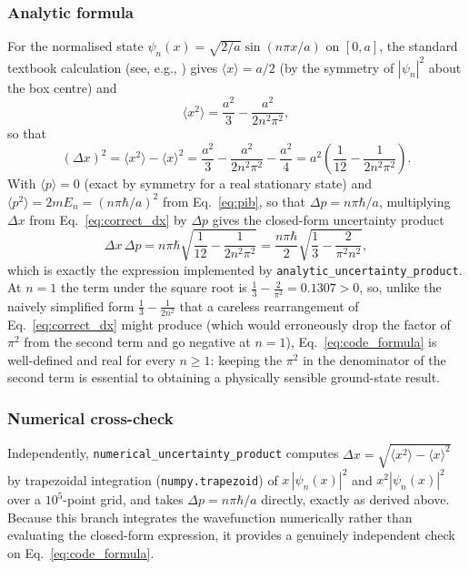 \documentclass[11pt]{article}
\begin{document}
\subsubsection{Analytic formula}
For the normalised state $\psi_n(x)=\sqrt{2/a}\sin(n\pi x/a)$ on $[0,a]$, the standard textbook calculation (see, e.g., \cite{griffiths}) gives $\langle x\rangle = a/2$ (by the symmetry of $|\psi_n|^2$ about the box centre) and
\begin{equation}
\langle x^2\rangle = \frac{a^2}{3} - \frac{a^2}{2n^2\pi^2},
\end{equation}
so that
\begin{equation}
(\Delta x)^2 = \langle x^2\rangle - \langle x\rangle^2 = \frac{a^2}{3}-\frac{a^2}{2n^2\pi^2} - \frac{a^2}{4} = a^2\left(\frac{1}{12}-\frac{1}{2n^2\pi^2}\right). \label{eq:correct_dx}
\end{equation}
With $\langle p\rangle=0$ (exact by symmetry for a real stationary state) and $\langle p^2\rangle = 2mE_n = (n\pi\hbar/a)^2$ from Eq.~\eqref{eq:pib}, so that $\Delta p = n\pi\hbar/a$, multiplying $\Delta x$ from Eq.~\eqref{eq:correct_dx} by $\Delta p$ gives the closed-form uncertainty product
\begin{equation}
\Delta x\,\Delta p = n\pi\hbar\sqrt{\frac{1}{12}-\frac{1}{2n^2\pi^2}} = \frac{n\pi\hbar}{2}\sqrt{\frac13-\frac{2}{\pi^2n^2}}, \label{eq:code_formula}
\end{equation}
which is exactly the expression implemented by \texttt{analytic\_uncertainty\_product}. At $n=1$ the term under the square root is $\tfrac13-\tfrac{2}{\pi^2}=0.1307>0$, so, unlike the naively simplified form $\tfrac13-\tfrac{1}{2n^2}$ that a careless rearrangement of Eq.~\eqref{eq:correct_dx} might produce (which would erroneously drop the factor of $\pi^2$ from the second term and go negative at $n=1$), Eq.~\eqref{eq:code_formula} is well-defined and real for every $n\ge1$: keeping the $\pi^2$ in the denominator of the second term is essential to obtaining a physically sensible ground-state result.

\subsubsection{Numerical cross-check}
Independently, \texttt{numerical\_uncertainty\_product} computes $\Delta x=\sqrt{\langle x^2\rangle-\langle x\rangle^2}$ by trapezoidal integration (\texttt{numpy.trapezoid}) of $x\,|\psi_n(x)|^2$ and $x^2|\psi_n(x)|^2$ over a $10^5$-point grid, and takes $\Delta p = n\pi\hbar/a$ directly, exactly as derived above. Because this branch integrates the wavefunction numerically rather than evaluating the closed-form expression, it provides a genuinely independent check on Eq.~\eqref{eq:code_formula}.
\end{document}
